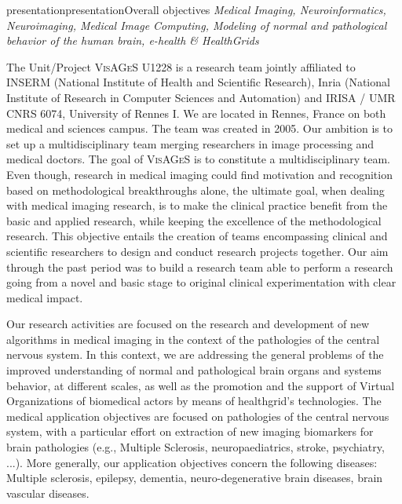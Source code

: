 \documentclass{ra2018}
\renewenvironment{motscle}{\begin{xmlelement}{keywords}}{\end{xmlelement}}
\begin{document}
        \begin{module}{presentation}{presentation}{Overall objectives}
        \label{sec:overall}
        \emph{
          Medical Imaging, 
          Neuroinformatics, 
          Neuroimaging, 
          Medical Image Computing, 
          Modeling of normal and pathological behavior of the human brain,
          e-health \& HealthGrids
        }
        
        The Unit/Project \textsc{VisAGeS} U1228 is a research team jointly affiliated to
        INSERM (National Institute of Health and Scientific Research), Inria (National
        Institute of Research in Computer Sciences and Automation) and IRISA / UMR CNRS
        6074, University of Rennes I. We are located in Rennes, France on both medical
        and sciences campus. The team was created in 2005. Our ambition is to set
        up a multidisciplinary team merging researchers in image processing and medical
        doctors.  The goal of \textsc{VisAGeS} is to constitute a multidisciplinary
        team. Even though, research in medical imaging could find motivation and
        recognition based on methodological breakthroughs alone, the ultimate goal,
        when dealing with medical imaging research, is to make the clinical practice
        benefit from the basic and applied research, while keeping the excellence of
        the methodological research. This objective entails the creation of teams
        encompassing clinical and scientific researchers to design and conduct research
        projects together. Our aim through the past period was to build a research team
        able to perform a research going from a novel and basic stage to original
        clinical experimentation with clear medical impact.
        
        Our research activities are focused on the research and development of new
        algorithms in medical imaging in the context of the pathologies of the central
        nervous system. In this context, we are addressing the general problems of the
        improved understanding of normal and pathological brain organs and systems
        behavior, at different scales, as well as the promotion and the support of Virtual
        Organizations of biomedical actors by means of healthgrid's technologies.  The
        medical application objectives are focused on pathologies of the central
        nervous system, with a particular effort on extraction of new imaging
        biomarkers for brain pathologies (e.g., Multiple Sclerosis, neuropaediatrics,
        stroke, psychiatry, ...). More generally, our application objectives concern
        the following diseases: Multiple sclerosis, epilepsy, dementia,
        neuro-degenerative brain diseases, brain vascular diseases.
        

        \end{module}
\end{document}

